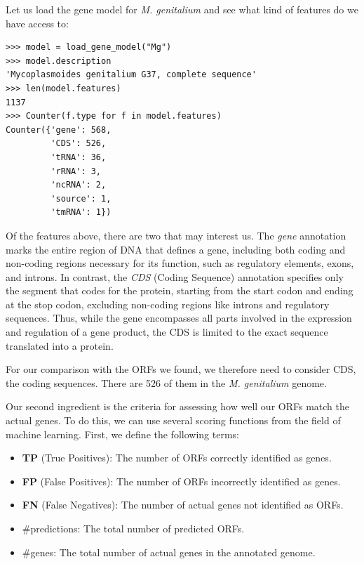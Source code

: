 Let us load the gene model for {\em M. genitalium} and see what kind of features do we have access to:

\vspace*{3mm}
\begin{lstlisting}
>>> model = load_gene_model("Mg")
>>> model.description
'Mycoplasmoides genitalium G37, complete sequence'
>>> len(model.features)
1137
>>> Counter(f.type for f in model.features)
Counter({'gene': 568,
         'CDS': 526,
         'tRNA': 36,
         'rRNA': 3,
         'ncRNA': 2,
         'source': 1,
         'tmRNA': 1})
\end{lstlisting}

Of the features above, there are two that may interest us. The {\em gene} annotation marks the entire region of DNA that defines a gene, including both coding and non-coding regions necessary for its function, such as regulatory elements, exons, and introns. In contrast, the {\em CDS} (Coding Sequence) annotation specifies only the segment that codes for the protein, starting from the start codon and ending at the stop codon, excluding non-coding regions like introns and regulatory sequences. Thus, while the gene encompasses all parts involved in the expression and regulation of a gene product, the CDS is limited to the exact sequence translated into a protein.

For our comparison with the ORFs we found, we therefore need to consider CDS, the coding sequences. There are 526 of them in the {\em M. genitalium} genome. 

Our second ingredient is the criteria for assessing how well our ORFs match the actual genes. To do this, we can use several scoring functions from the field of machine learning. First, we define the following terms:

\begin{itemize}
    \item \textbf{TP} (True Positives): The number of ORFs correctly identified as genes.
    \item \textbf{FP} (False Positives): The number of ORFs incorrectly identified as genes.
    \item \textbf{FN} (False Negatives): The number of actual genes not identified as ORFs.
    \item \#predictions: The total number of predicted ORFs.
    \item \#genes: The total number of actual genes in the annotated genome.
\end{itemize}

